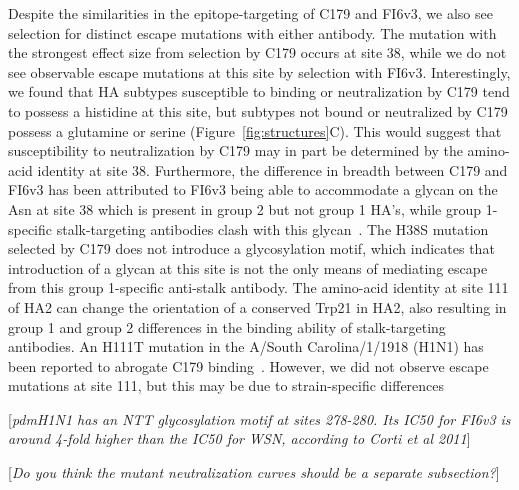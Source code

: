 \documentclass[11pt]{article}
\newcommand{\comment}[1]{{\color{red}[\textsl{#1}]}}
\begin{document}
Despite the similarities in the epitope-targeting of C179 and FI6v3, we also see selection for distinct escape mutations with either antibody.
The mutation with the strongest effect size from selection by C179 occurs at site 38, while we do not see observable escape mutations at this site by selection with FI6v3.
Interestingly, we found that HA subtypes susceptible to binding or neutralization by C179 tend to possess a histidine at this site, but subtypes not bound or neutralized by C179 possess a glutamine or serine (Figure~\ref{fig:structures}C). 
This would suggest that susceptibility to neutralization by C179 may in part be determined by the amino-acid identity at site 38.
Furthermore, the difference in breadth between C179 and FI6v3 has been attributed to FI6v3 being able to accommodate a glycan on the Asn at site 38 which is present in group 2 but not group 1 HA's, while group 1-specific stalk-targeting antibodies clash with this glycan~\citep{corti2011neutralizing, sui2009structural, ekiert2009antibody}. 
The H38S mutation selected by C179 does not introduce a glycosylation motif, which indicates that introduction of a glycan at this site is not the only means of mediating escape from this group 1-specific anti-stalk antibody.
The amino-acid identity at site 111 of HA2 can change the orientation of a conserved Trp21 in HA2, also resulting in group 1 and group 2 differences in the binding ability of stalk-targeting antibodies. An H111T mutation in the A/South Carolina/1/1918 (H1N1) has been reported to abrogate C179 binding~\citep{dreyfus2013structure}.
However, we did not observe escape mutations at site 111, but this may be due to strain-specific differences

\comment{pdmH1N1 has an NTT glycosylation motif at sites 278-280. Its IC50 for FI6v3 is around 4-fold higher than the IC50 for WSN, according to Corti et al 2011}

\comment{Do you think the mutant neutralization curves should be a separate subsection?}
\end{document}
